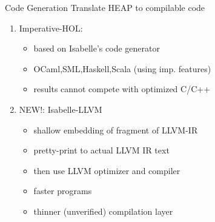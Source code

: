 \documentclass[fleqn]{beamer}
\begin{document}
\begin{frame}{Code Generation}
  Translate HEAP to compilable code
  \onslide<+->

  \begin{minipage}{.69\textwidth}
  \begin{enumerate}
   \item<+-> Imperative-HOL:
    \begin{itemize}
     \item based on Isabelle's code generator
     \item OCaml,SML,Haskell,Scala (using imp. features)
     \item results cannot compete with optimized C/C++
    \end{itemize}
   \item<+-> NEW!: Isabelle-LLVM
    \begin{itemize}
     \item shallow embedding of fragment of LLVM-IR
     \item pretty-print to actual LLVM IR text
     \item then use LLVM optimizer and compiler
     \item faster programs
     \item thinner (unverified) compilation layer
    \end{itemize}
  \end{enumerate}
  \end{minipage}%
  \begin{minipage}{.3\textwidth}
  \end{minipage}


\end{frame}
\end{document}

